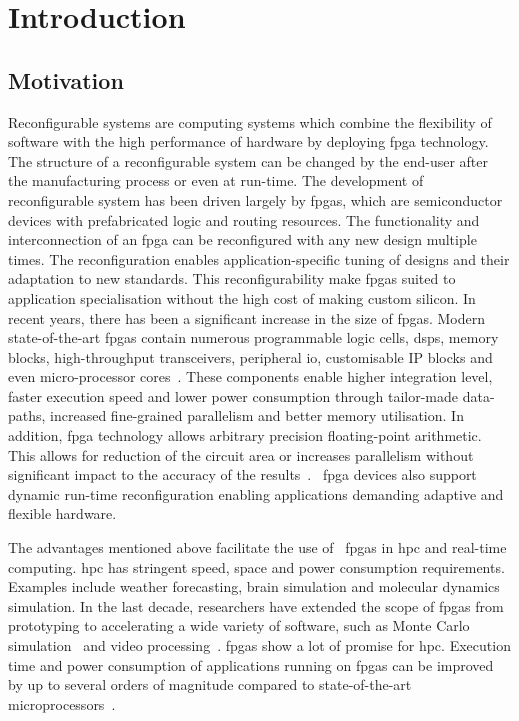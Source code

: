 
\chapter{Introduction}

\label{ch:introduction}

\section{Motivation}

Reconfigurable systems are computing systems which combine the flexibility of software with the high performance of hardware by deploying \gls{fpga} technology.
The structure of a reconfigurable system can be changed by the end-user after the manufacturing process or even at run-time.
The development of reconfigurable system has been driven largely by \glspl{fpga}, which are semiconductor devices with prefabricated logic and routing resources.
The functionality and interconnection of an \gls{fpga} can be reconfigured with any new design multiple times.
The reconfiguration enables application-specific tuning of designs and their adaptation to new standards.
This reconfigurability make \glspl{fpga} suited to application specialisation without the high cost of making custom silicon.
In recent years, there has been a significant increase in the size of \glspl{fpga}.
Modern state-of-the-art \glspl{fpga} contain numerous programmable logic cells, \glspl{dsp}, memory blocks, high-throughput transceivers, peripheral \gls{io}, customisable IP blocks and even micro-processor cores~\cite{alterasoc,xilinxzynq}.
These components enable higher integration level, faster execution speed and lower power consumption through tailor-made data-paths, increased fine-grained parallelism and better memory utilisation.
In addition, \gls{fpga} technology allows arbitrary precision floating-point arithmetic.
This allows for reduction of the circuit area or increases parallelism without significant impact to the accuracy of the results~\cite{chow11,chow12}.
~\gls{fpga} devices also support dynamic run-time reconfiguration enabling applications demanding adaptive and flexible hardware. 

The advantages mentioned above facilitate the use of ~\glspl{fpga} in \gls{hpc} and real-time computing.
\gls{hpc} has stringent speed, space and power consumption requirements.
Examples include weather forecasting, brain simulation and molecular dynamics simulation. 
In the last decade, researchers have extended the scope of \glspl{fpga} from prototyping to accelerating a wide variety of software, such as Monte Carlo simulation~\cite{chow12} and video processing~\cite{guo04}.
\glspl{fpga} show a lot of promise for \gls{hpc}.
Execution time and power consumption of applications running on \glspl{fpga} can be improved by up to several orders of magnitude compared to state-of-the-art microprocessors~\cite{chow11,chow12,craven07,guo04,pell11}.

